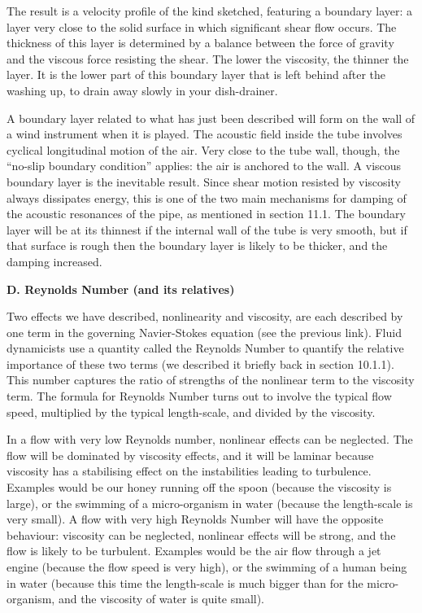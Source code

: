 
  The result is a velocity profile of the kind sketched, featuring a boundary 
  layer: a layer very close to the solid surface in which significant shear 
  flow occurs. The thickness of this layer is determined by a balance between 
  the force of gravity and the viscous force resisting the shear. The lower the 
  viscosity, the thinner the layer. It is the lower part of this boundary layer 
  that is left behind after the washing up, to drain away slowly in your 
  dish-drainer. 

  A boundary layer related to what has just been described will form on the 
  wall of a wind instrument when it is played. The acoustic field inside the 
  tube involves cyclical longitudinal motion of the air. Very close to the tube 
  wall, though, the “no-slip boundary condition” applies: the air is anchored 
  to the wall. A viscous boundary layer is the inevitable result. Since shear 
  motion resisted by viscosity always dissipates energy, this is one of the two 
  main mechanisms for damping of the acoustic resonances of the pipe, as 
  mentioned in section 11.1. The boundary layer will be at its thinnest if the 
  internal wall of the tube is very smooth, but if that surface is rough then 
  the boundary layer is likely to be thicker, and the damping increased. 

  \textbf{D. Reynolds Number (and its relatives)} 

  Two effects we have described, nonlinearity and viscosity, are each described 
  by one term in the governing Navier-Stokes equation (see the previous link). 
  Fluid dynamicists use a quantity called the Reynolds Number to quantify the 
  relative importance of these two terms (we described it briefly back in 
  section 10.1.1). This number captures the ratio of strengths of the nonlinear 
  term to the viscosity term. The formula for Reynolds Number turns out to 
  involve the typical flow speed, multiplied by the typical length-scale, and 
  divided by the viscosity. 

  In a flow with very low Reynolds number, nonlinear effects can be neglected. 
  The flow will be dominated by viscosity effects, and it will be laminar 
  because viscosity has a stabilising effect on the instabilities leading to 
  turbulence. Examples would be our honey running off the spoon (because the 
  viscosity is large), or the swimming of a micro-organism in water (because 
  the length-scale is very small). A flow with very high Reynolds Number will 
  have the opposite behaviour: viscosity can be neglected, nonlinear effects 
  will be strong, and the flow is likely to be turbulent. Examples would be the 
  air flow through a jet engine (because the flow speed is very high), or the 
  swimming of a human being in water (because this time the length-scale is 
  much bigger than for the micro-organism, and the viscosity of water is quite 
  small). 

